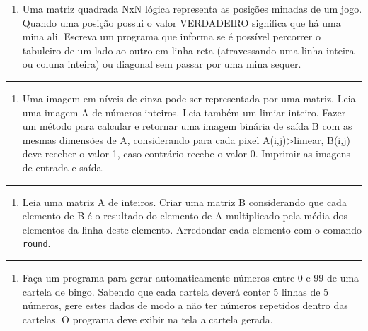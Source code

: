 \documentclass[12pt,a4paper]{article}
\renewcommand{\linethickness}{0.05em}
\providecommand{\tightlist}{%
      \setlength{\itemsep}{0pt}\setlength{\parskip}{0pt}}
\begin{document}
\begin{enumerate}
\def\labelenumi{\arabic{enumi}.}
\tightlist
\item
  Uma matriz quadrada NxN lógica representa as posições minadas de um
  jogo. Quando uma posição possui o valor VERDADEIRO significa que há
  uma mina ali. Escreva um programa que informa se é possível percorrer
  o tabuleiro de um lado ao outro em linha reta (atravessando uma linha
  inteira ou coluna inteira) ou diagonal sem passar por uma mina sequer.
\end{enumerate}

    \begin{center}\rule{0.5\linewidth}{\linethickness}\end{center}

\begin{enumerate}
\def\labelenumi{\arabic{enumi}.}
\setcounter{enumi}{1}
\tightlist
\item
  Uma imagem em níveis de cinza pode ser representada por uma matriz.
  Leia uma imagem A de números inteiros. Leia também um limiar inteiro.
  Fazer um método para calcular e retornar uma imagem binária de saída B
  com as mesmas dimensões de A, considerando para cada pixel
  A(i,j)\textgreater{}limear, B(i,j) deve receber o valor 1, caso
  contrário recebe o valor 0. Imprimir as imagens de entrada e saída.
\end{enumerate}

    \begin{center}\rule{0.5\linewidth}{\linethickness}\end{center}

\begin{enumerate}
\def\labelenumi{\arabic{enumi}.}
\setcounter{enumi}{2}
\tightlist
\item
  Leia uma matriz A de inteiros. Criar uma matriz B considerando que
  cada elemento de B é o resultado do elemento de A multiplicado pela
  média dos elementos da linha deste elemento. Arredondar cada elemento
  com o comando \texttt{round}.
\end{enumerate}

    \begin{center}\rule{0.5\linewidth}{\linethickness}\end{center}

\begin{enumerate}
\def\labelenumi{\arabic{enumi}.}
\setcounter{enumi}{3}
\tightlist
\item
  Faça um programa para gerar automaticamente números entre 0 e 99 de
  uma cartela de bingo. Sabendo que cada cartela deverá conter 5 linhas
  de 5 números, gere estes dados de modo a não ter números repetidos
  dentro das cartelas. O programa deve exibir na tela a cartela gerada.
\end{enumerate}
\end{document}
